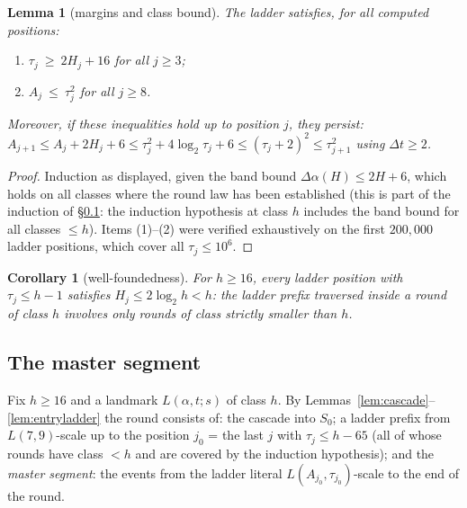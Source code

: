 \documentclass[11pt]{amsart}
\newtheorem{lemma}[theorem]{Lemma}
\newtheorem{corollary}[theorem]{Corollary}
\theoremstyle{definition}
\begin{document}
\begin{lemma}[margins and class bound]\label{lem:ladder}
The ladder satisfies, for all computed positions:
\begin{enumerate}
\item $\tau_j\ \ge\ 2H_j+16$ for all $j\ge3$;
\item $A_j\ \le\ \tau_j^{2}$ for all $j\ge8$.
\end{enumerate}
Moreover, if these inequalities hold up to position $j$, they persist:
$A_{j+1}\le A_j+2H_j+6\le\tau_j^{2}+4\log_2\tau_j+6\le(\tau_j+2)^{2}\le\tau_{j+1}^{2}$
using $\Delta t\ge2$.
\end{lemma}

\begin{proof}
Induction as displayed, given the band bound
$\Delta\alpha(H)\le 2H+6$, which holds on all classes where the round law
has been established (this is part of the induction of \S\ref{s:master}:
the induction hypothesis at class $h$ includes the band bound for all
classes $\le h$). Items (1)--(2) were verified exhaustively on the first
$200{,}000$ ladder positions, which cover all $\tau_j\le10^{6}$.
\end{proof}

\begin{corollary}[well-foundedness]\label{cor:wellfounded}
For $h\ge16$, every ladder position with $\tau_j\le h-1$ satisfies
$H_j\le 2\log_2 h<h$: the ladder prefix traversed inside a round of class
$h$ involves only rounds of class strictly smaller than $h$.
\end{corollary}

\subsection{The master segment}\label{s:master}

Fix $h\ge16$ and a landmark $L(\alpha,t;s)$ of class $h$. By
Lemmas~\ref{lem:cascade}--\ref{lem:entryladder} the round consists of: the
cascade into $S_0$; a ladder prefix from $L(7,9)$-scale up to the position
$j_0$ = the last $j$ with $\tau_j\le h-65$ (all of whose rounds have class
$<h$ and are covered by the induction hypothesis); and the \emph{master
segment}: the events from the ladder literal
$L(A_{j_0},\tau_{j_0})$-scale to the end of the round.
\end{document}
